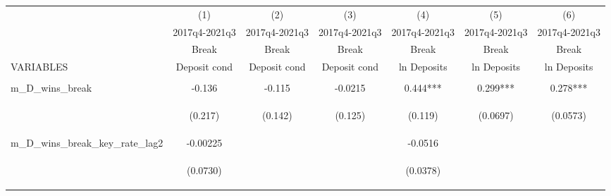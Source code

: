 



\begin{tabular}{lcccccc} \hline
 & (1) & (2) & (3) & (4) & (5) & (6) \\
 & 2017q4-2021q3 & 2017q4-2021q3 & 2017q4-2021q3 & 2017q4-2021q3 & 2017q4-2021q3 & 2017q4-2021q3 \\
 & Break & Break & Break & Break & Break & Break \\
VARIABLES & Deposit cond & Deposit cond & Deposit cond & ln Deposits & ln Deposits & ln Deposits \\ \hline
\vspace{4pt} & \begin{footnotesize}\end{footnotesize} & \begin{footnotesize}\end{footnotesize} & \begin{footnotesize}\end{footnotesize} & \begin{footnotesize}\end{footnotesize} & \begin{footnotesize}\end{footnotesize} & \begin{footnotesize}\end{footnotesize} \\
m\_D\_wins\_break & -0.136 & -0.115 & -0.0215 & 0.444*** & 0.299*** & 0.278*** \\
\vspace{4pt} & \begin{footnotesize}(0.217)\end{footnotesize} & \begin{footnotesize}(0.142)\end{footnotesize} & \begin{footnotesize}(0.125)\end{footnotesize} & \begin{footnotesize}(0.119)\end{footnotesize} & \begin{footnotesize}(0.0697)\end{footnotesize} & \begin{footnotesize}(0.0573)\end{footnotesize} \\
m\_D\_wins\_break\_key\_rate\_lag2 & -0.00225 &  &  & -0.0516 &  &  \\
\vspace{4pt} & \begin{footnotesize}(0.0730)\end{footnotesize} & \begin{footnotesize}\end{footnotesize} & \begin{footnotesize}\end{footnotesize} & \begin{footnotesize}(0.0378)\end{footnotesize} & \begin{footnotesize}\end{footnotesize} & \begin{footnotesize}\end{footnotesize} \\

\end{tabular}
